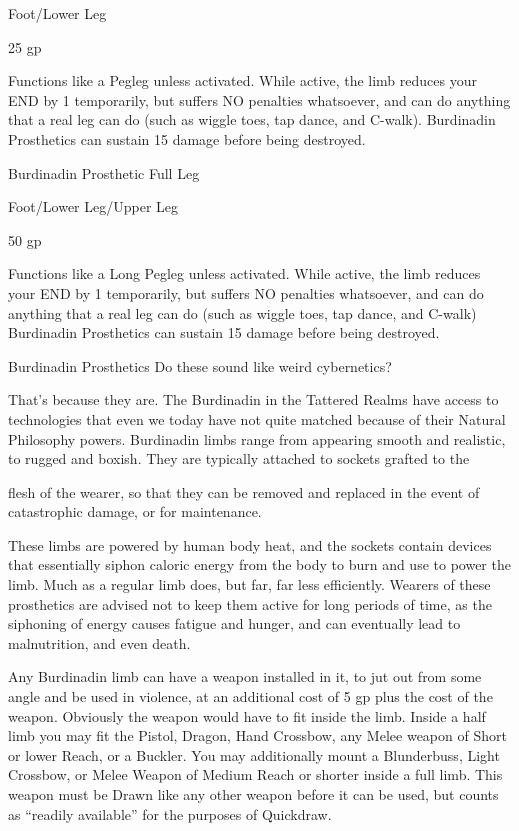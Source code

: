 \documentclass[oneside,11pt,english]{book}
\begin{document}
Foot/Lower 
Leg 

25 
gp 

Functions like a Pegleg unless activated. While active, the limb reduces 
your END by 1 temporarily, but suffers NO penalties whatsoever, and 
can do anything that a real leg can do (such as wiggle toes, tap dance, 
and C-walk). Burdinadin Prosthetics can sustain 15 damage before 
being destroyed. 

Burdinadin 
Prosthetic Full 
Leg 

Foot/Lower 
Leg/Upper 
Leg 

50 
gp 

Functions like a Long Pegleg unless activated. While active, the limb 
reduces your END by 1 temporarily, but suffers NO penalties 
whatsoever, and can do anything that a real leg can do (such as wiggle 
toes, tap dance, and C-walk) Burdinadin Prosthetics can sustain 15 
damage before being destroyed. 

 

Burdinadin Prosthetics 
Do these sound like weird cybernetics? 

 

That’s because they are. The Burdinadin in the Tattered Realms have access to technologies that even we 
today have not quite matched because of their Natural Philosophy powers. Burdinadin limbs range from 
appearing smooth and realistic, to rugged and boxish. They are typically attached to sockets grafted to the 


flesh of the wearer, so that they can be removed and replaced in the event of catastrophic damage, or for 
maintenance. 

 

These limbs are powered by human body heat, and the sockets contain devices that essentially siphon 
caloric energy from the body to burn and use to power the limb. Much as a regular limb does, but far, far 
less efficiently. Wearers of these prosthetics are advised not to keep them active for long periods of time, 
as the siphoning of energy causes fatigue and hunger, and can eventually lead to malnutrition, and even 
death. 

 

Any Burdinadin limb can have a weapon installed in it, to jut out from some angle and be used in 
violence, at an additional cost of 5 gp plus the cost of the weapon. Obviously the weapon would have to 
fit inside the limb. Inside a half limb you may fit the Pistol, Dragon, Hand Crossbow, any Melee weapon 
of Short or lower Reach, or a Buckler. You may additionally mount a Blunderbuss, Light Crossbow, or 
Melee Weapon of Medium Reach or shorter inside a full limb. This weapon must be Drawn like any other 
weapon before it can be used, but counts as “readily available” for the purposes of Quickdraw. 
\end{document}
